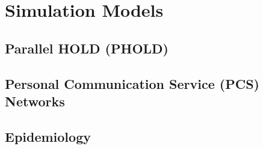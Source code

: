 \section{Simulation Models}

\subsection{Parallel HOLD (PHOLD)}

\subsection{Personal Communication Service (PCS) Networks}

\subsection{Epidemiology}
